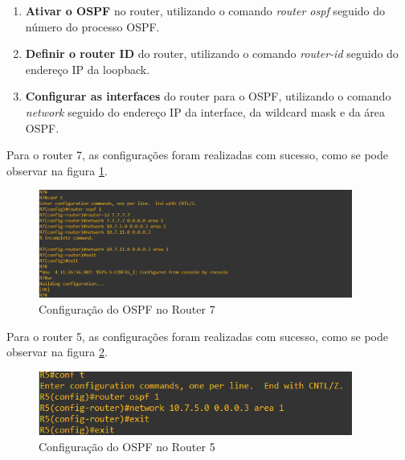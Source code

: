 \documentclass[11pt,english, openright, oneside]{book}
\begin{document}
\begin{enumerate}
  \item \textbf{Ativar o OSPF} no router, utilizando o comando \textit{router ospf} seguido do número do processo OSPF.
  \item \textbf{Definir o router ID} do router, utilizando o comando \textit{router-id} seguido do endereço IP da loopback.
  \item \textbf{Configurar as interfaces} do router para o OSPF, utilizando o comando \textit{network} seguido do endereço IP da interface, da wildcard mask e da área OSPF.
\end{enumerate}
\vspace{0.2cm}

Para o router 7, as configurações foram realizadas com sucesso, como se pode observar na figura \ref{fig:config18}.

\begin{figure}[H]
    \centering
    \includegraphics[width=0.92\textwidth]{imagens/Tarefa3/12.config_R7_ospf.png}
    \caption{Configuração do OSPF no Router 7}
    \label{fig:config18}
\end{figure}
\vspace{0.2cm}

Para o router 5, as configurações foram realizadas com sucesso, como se pode observar na figura \ref{fig:config19}.
\vspace{0.2cm}

\begin{figure}[H]
    \centering
    \includegraphics[width=0.92\textwidth]{imagens/Tarefa3/12.config_R5_ospf.png}
    \caption{Configuração do OSPF no Router 5}
    \label{fig:config19}
\end{figure}
\vspace{0.2cm}
\end{document}
